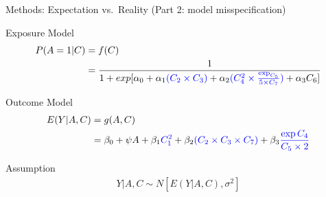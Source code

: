 \documentclass[
  ignorenonframetext,
  aspectratio=169]{beamer}
\begin{document}
\begin{frame}{Methods: Expectation vs.~Reality (Part 2: model
misspecification)}
\protect\hypertarget{methods-expectation-vs.-reality-part-2-model-misspecification}{}
\begin{block}{Exposure Model}
\protect\hypertarget{exposure-model-1}{}
\begin{equation} 
\begin{aligned}
P(A=1|C) &= f(C) \\
        &= \frac{1}{1+exp[\alpha_0 + \alpha_1 \textcolor{blue}{(C_2 \times C_3)} + \alpha_2 \textcolor{blue}{(C_4^2 \times \frac{\exp_{C_5}}{5 \times C_7})} + \alpha_3 C_6 ]} \nonumber
\end{aligned}
\end{equation}
\end{block}

\begin{block}{Outcome Model}
\protect\hypertarget{outcome-model-1}{}
\begin{equation} 
\begin{aligned}
E(Y|A,C) &= g(A,C)\\
&= \beta_0 + \psi A + \beta_1 \textcolor{blue}{C_1^2} + \beta_2 \textcolor{blue}{(C_2 \times C_3 \times C_7)} + \beta_3 \textcolor{blue}{\frac{\exp{C_4}}{C_5 \times 2}}\nonumber
\end{aligned}
\end{equation}
\end{block}

\begin{block}{Assumption}
\protect\hypertarget{assumption-1}{}
\begin{equation} 
\begin{aligned}
Y | A,C \sim N[E(Y|A,C), \sigma^2]\nonumber
\end{aligned}
\end{equation}
\end{block}
\end{frame}
\end{document}
